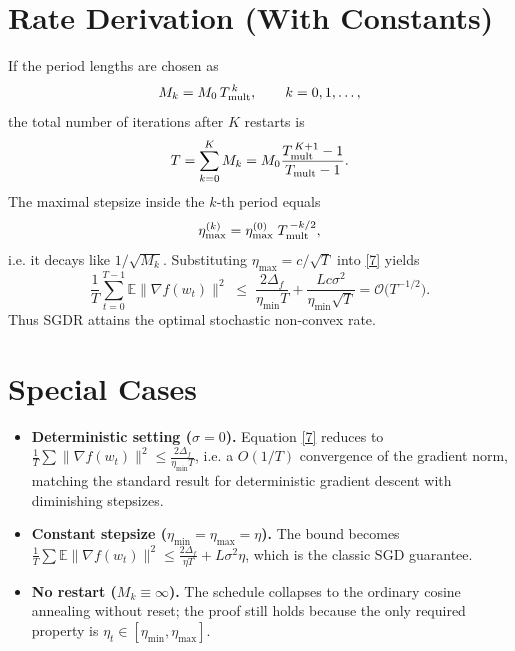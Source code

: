\documentclass{article}
\begin{document}
\section*{Rate Derivation (With Constants)}
If the period lengths are chosen as
\[
M_k = M_0\,T_{\rm mult}^{\,k},\qquad k=0,1,\dots,
\]
the total number of iterations after $K$ restarts is
\[
T = \sum_{k=0}^{K} M_k
  = M_0\frac{T_{\rm mult}^{\,K+1}-1}{T_{\rm mult}-1}.
\]
The maximal stepsize inside the $k$‑th period equals
\[
\eta_{\max}^{(k)} = \eta_{\max}^{(0)}\;T_{\rm mult}^{\,-k/2},
\]
i.e. it decays like $1/\sqrt{M_k}$.  Substituting
$\eta_{\max}=c/\sqrt{T}$ into \eqref{7} yields
\[
\frac{1}{T}\sum_{t=0}^{T-1}\mathbb{E}\|\nabla f(w_t)\|^{2}
\;\le\;
\frac{2\Delta_f}{\eta_{\min}T}
   +\frac{Lc\sigma^{2}}{\eta_{\min}\sqrt{T}}
   =\mathcal{O}\!\bigl(T^{-1/2}\bigr).
\]
Thus SGDR attains the optimal stochastic non‑convex rate.

\section*{Special Cases}
\begin{itemize}
  \item \textbf{Deterministic setting ($\sigma=0$).}  Equation \eqref{7}
    reduces to $\frac{1}{T}\sum\|\nabla f(w_t)\|^{2}\le
    \frac{2\Delta_f}{\eta_{\min}T}$, i.e. a $O(1/T)$ convergence of the
    gradient norm, matching the standard result for deterministic
    gradient descent with diminishing stepsizes.
  \item \textbf{Constant stepsize ($\eta_{\min}=\eta_{\max}=\eta$).}
    The bound becomes
    $\frac{1}{T}\sum\mathbb{E}\|\nabla f(w_t)\|^{2}
      \le \frac{2\Delta_f}{\eta T}+L\sigma^{2}\eta$,
    which is the classic SGD guarantee.
  \item \textbf{No restart ($M_k\equiv\infty$).}
    The schedule collapses to the ordinary cosine annealing without
    reset; the proof still holds because the only required property is
    $\eta_t\in[\eta_{\min},\eta_{\max}]$.
\end{itemize}

\end{document}

